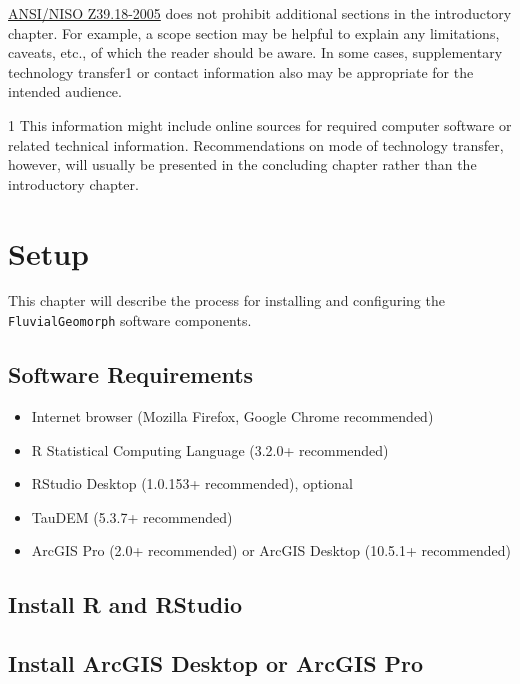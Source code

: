 \documentclass[]{book}
\providecommand{\tightlist}{%
  \setlength{\itemsep}{0pt}\setlength{\parskip}{0pt}}
\theoremstyle{definition}
\theoremstyle{definition}
\theoremstyle{definition}
\theoremstyle{remark}
\begin{document}
\href{https://groups.niso.org/apps/group_public/download.php/12038/Z39_18_2005_R2010.pdf}{ANSI/NISO
Z39.18-2005} does not prohibit additional sections in the introductory
chapter. For example, a scope section may be helpful to explain any
limitations, caveats, etc., of which the reader should be aware. In some
cases, supplementary technology transfer1 or contact information also
may be appropriate for the intended audience.

1 This information might include online sources for required computer
software or related technical information. Recommendations on mode of
technology transfer, however, will usually be presented in the
concluding chapter rather than the introductory chapter.

\chapter{Setup}\label{setup}

This chapter will describe the process for installing and configuring
the \texttt{FluvialGeomorph} software components.

\section{Software Requirements}\label{software-requirements}

\begin{itemize}
\tightlist
\item
  Internet browser (Mozilla Firefox, Google Chrome recommended)
\item
  R Statistical Computing Language (3.2.0+ recommended)
\item
  RStudio Desktop (1.0.153+ recommended), optional
\item
  TauDEM (5.3.7+ recommended)
\item
  ArcGIS Pro (2.0+ recommended) or ArcGIS Desktop (10.5.1+ recommended)
\end{itemize}

\section{Install R and RStudio}\label{install-r-and-rstudio}

\section{Install ArcGIS Desktop or ArcGIS
Pro}\label{install-arcgis-desktop-or-arcgis-pro}
\end{document}
